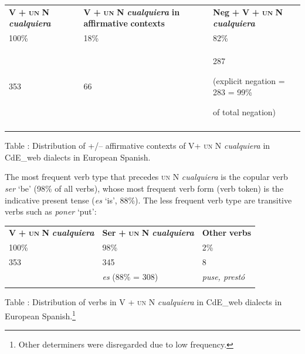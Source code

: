 \documentclass[output=paper]{langscibook}
\begin{document}
\begin{tabularx}{\textwidth}{XXX}

\lsptoprule

 \textbf{V} \textbf{+} \textbf{\textsc{un}} \textbf{N} \textbf{\textit{cualquiera}} & \textbf{V} \textbf{+} \textbf{\textsc{un}} \textbf{N} \textbf{\textit{cualquiera}} \textbf{in} \textbf{affirmative} \textbf{contexts} & \textbf{Neg} \textbf{+} \textbf{V} \textbf{+} \textbf{\textsc{un}} \textbf{N} \textbf{\textit{cualquiera}}\\
 100\% & 18\% & 82\%\\
 353 & 66 & { 287}

{ (explicit negation = 283 = 99\%} 

 of total negation)\\
\lspbottomrule
\end{tabularx}
\begin{styletablecaption}
Table : Distribution of +/– affirmative contexts of V+ \textsc{un} N \textit{cualquiera} in CdE\_web dialects in European Spanish.
\end{styletablecaption}

The most frequent verb type that precedes \textsc{un} N \textit{cualquiera} is the copular verb \textit{ser} ‘be’ (98\% of all verbs), whose most frequent verb form (verb token) is the indicative present tense (\textit{es} ‘is’, 88\%). The less frequent verb type are transitive verbs such as \textit{poner} ‘put’:


\begin{tabularx}{\textwidth}{XXX}

\lsptoprule

 \textbf{V} \textbf{+} \textbf{\textsc{un}} \textbf{N} \textbf{\textit{cualquiera}} & \textbf{Ser} \textbf{+} \textbf{\textsc{un}} \textbf{N} \textbf{\textit{cualquiera}} & \textbf{Other} \textbf{verbs}\\
 100\% & 98\% & 2\%\\
 353 & 345 & 8\\
& \textit{es} (88\% = 308) & \textit{puse, prestó}\\
\lspbottomrule
\end{tabularx}
\begin{styletablecaption}
Table : Distribution of verbs in V + \textsc{un} N \textit{cualquiera} in CdE\_web dialects in European Spanish.\footnote{ \textrm{Other determiners were disregarded due to low frequency.}}
\end{styletablecaption}
\end{document}
